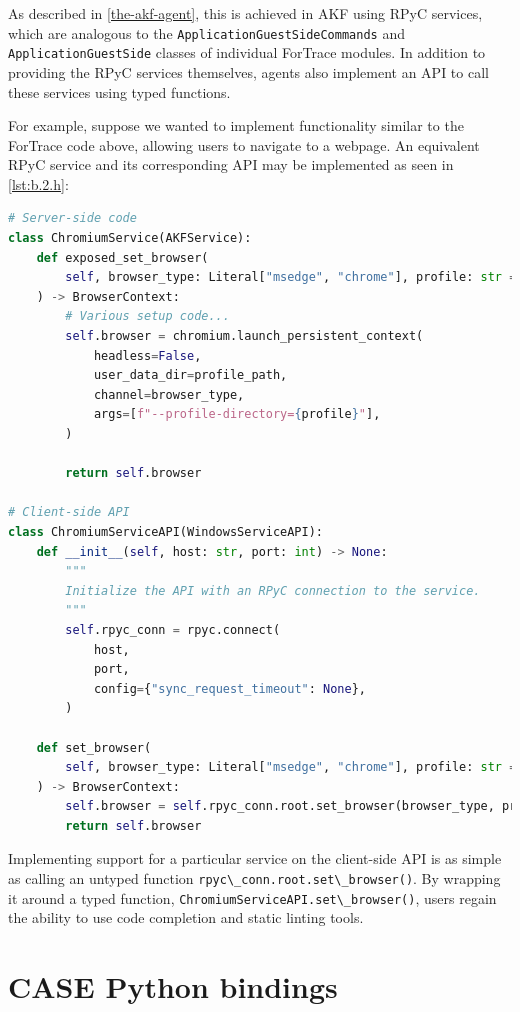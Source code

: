 \documentclass[letterpaper,12pt]{report}
\newcommand{\passthrough}[1]{#1}
\begin{document}
As described in \autoref{the-akf-agent}, this is achieved in AKF using RPyC services, which are analogous
to the \passthrough{\lstinline!ApplicationGuestSideCommands!} and
\passthrough{\lstinline!ApplicationGuestSide!} classes of individual
ForTrace modules. In addition to providing the RPyC services themselves,
agents also implement an API to call these services using typed
functions.

For example, suppose we wanted to implement functionality similar to the
ForTrace code above, allowing users to navigate to a webpage. An
equivalent RPyC service and its corresponding API may be implemented as
seen in \autoref{lst:b.2.h}:

\begin{lstlisting}[label={lst:b.2.h}, caption={Minimal reimplementation of ForTrace module as an RPyC service}, language=Python]
# Server-side code
class ChromiumService(AKFService):
    def exposed_set_browser(
        self, browser_type: Literal["msedge", "chrome"], profile: str = "Default"
    ) -> BrowserContext:
        # Various setup code...
        self.browser = chromium.launch_persistent_context(
            headless=False,
            user_data_dir=profile_path,
            channel=browser_type,
            args=[f"--profile-directory={profile}"],
        )

        return self.browser

# Client-side API
class ChromiumServiceAPI(WindowsServiceAPI):
    def __init__(self, host: str, port: int) -> None:
        """
        Initialize the API with an RPyC connection to the service.
        """
        self.rpyc_conn = rpyc.connect(
            host,
            port,
            config={"sync_request_timeout": None},
        )

    def set_browser(
        self, browser_type: Literal["msedge", "chrome"], profile: str = "Default"
    ) -> BrowserContext:
        self.browser = self.rpyc_conn.root.set_browser(browser_type, profile)
        return self.browser
\end{lstlisting}

Implementing support for a particular service on the client-side API is
as simple as calling an untyped function
\passthrough{\lstinline!rpyc\_conn.root.set\_browser()!}. By wrapping it
around a typed function,
\passthrough{\lstinline!ChromiumServiceAPI.set\_browser()!}, users
regain the ability to use code completion and static linting tools.

\section{CASE Python bindings}\label{case-python-bindings}
\end{document}
